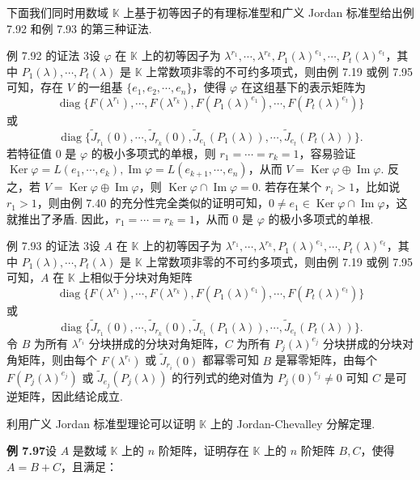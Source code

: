 \documentclass[UTF8,12pt,a4paper,fontset=fandol]{ctexart}
\begin{document}
下面我们同时用数域 $\mathbb{K}$ 上基于初等因子的有理标准型和广义 Jordan 标准型给出例 7.92 和例 7.93 的第三种证法.

例 7.92 的证法 3\quad 设 $\varphi$ 在 $\mathbb{K}$ 上的初等因子为 $\lambda^{r_1},\cdots,\lambda^{r_k},P_1(\lambda)^{e_1},\cdots,P_t(\lambda)^{e_t}$，其中 $P_1(\lambda),\cdots,P_t(\lambda)$ 是 $\mathbb{K}$ 上常数项非零的不可约多项式，则由例 7.19 或例 7.95 可知，存在 $V$ 的一组基 $\{e_1,e_2,\cdots,e_n\}$，使得 $\varphi$ 在这组基下的表示矩阵为
\[
\operatorname{diag}\{F(\lambda^{r_1}),\cdots,F(\lambda^{r_k}),F(P_1(\lambda)^{e_1}),\cdots,F(P_t(\lambda)^{e_t})\}
\]
或
\[
\operatorname{diag}\{\widetilde J_{r_1}(0),\cdots,\widetilde J_{r_k}(0),\widetilde J_{e_1}(P_1(\lambda)),\cdots,\widetilde J_{e_t}(P_t(\lambda))\}.
\]
若特征值 0 是 $\varphi$ 的极小多项式的单根，则 $r_1=\cdots=r_k=1$，容易验证 $\operatorname{Ker}\varphi=L(e_1,\cdots,e_k),\operatorname{Im}\varphi=L(e_{k+1},\cdots,e_n)$，从而 $V=\operatorname{Ker}\varphi\oplus\operatorname{Im}\varphi$. 反之，若 $V=\operatorname{Ker}\varphi\oplus\operatorname{Im}\varphi$，则 $\operatorname{Ker}\varphi\cap\operatorname{Im}\varphi=0$. 若存在某个 $r_i>1$，比如说 $r_1>1$，则由例 7.40 的充分性完全类似的证明可知，$0\ne e_1\in\operatorname{Ker}\varphi\cap\operatorname{Im}\varphi$，这就推出了矛盾. 因此，$r_1=\cdots=r_k=1$，从而 0 是 $\varphi$ 的极小多项式的单根.

例 7.93 的证法 3\quad 设 $A$ 在 $\mathbb{K}$ 上的初等因子为 $\lambda^{r_1},\cdots,\lambda^{r_k},P_1(\lambda)^{e_1},\cdots,P_t(\lambda)^{e_t}$，其中 $P_1(\lambda),\cdots,P_t(\lambda)$ 是 $\mathbb{K}$ 上常数项非零的不可约多项式，则由例 7.19 或例 7.95 可知，$A$ 在 $\mathbb{K}$ 上相似于分块对角矩阵
\[
\operatorname{diag}\{F(\lambda^{r_1}),\cdots,F(\lambda^{r_k}),F(P_1(\lambda)^{e_1}),\cdots,F(P_t(\lambda)^{e_t})\}
\]
或
\[
\operatorname{diag}\{\widetilde J_{r_1}(0),\cdots,\widetilde J_{r_k}(0),\widetilde J_{e_1}(P_1(\lambda)),\cdots,\widetilde J_{e_t}(P_t(\lambda))\}.
\]
令 $B$ 为所有 $\lambda^{r_i}$ 分块拼成的分块对角矩阵，$C$ 为所有 $P_j(\lambda)^{e_j}$ 分块拼成的分块对角矩阵，则由每个 $F(\lambda^{r_i})$ 或 $\widetilde J_{r_i}(0)$ 都幂零可知 $B$ 是幂零矩阵，由每个 $F(P_j(\lambda)^{e_j})$ 或 $\widetilde J_{e_j}(P_j(\lambda))$ 的行列式的绝对值为 $P_j(0)^{e_j}\ne0$ 可知 $C$ 是可逆矩阵，因此结论成立.

利用广义 Jordan 标准型理论可以证明 $\mathbb{K}$ 上的 Jordan-Chevalley 分解定理.

\noindent\textbf{例 7.97}\quad 设 $A$ 是数域 $\mathbb{K}$ 上的 $n$ 阶矩阵，证明存在 $\mathbb{K}$ 上的 $n$ 阶矩阵 $B,C$，使得 $A=B+C$，且满足：
\end{document}
